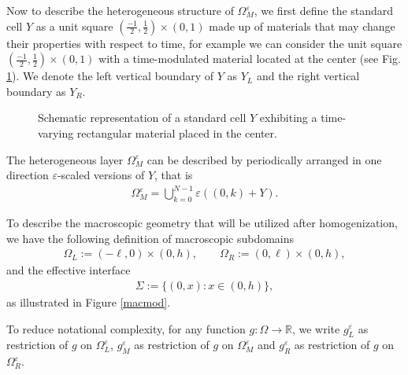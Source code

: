 \documentclass[11pt]{article}
\def\es{\varepsilon}
\def\orr{\Omega_R^\varepsilon}
\def\omm{\Omega_M^\varepsilon}
\def\oll{\Omega_L^\varepsilon}
\begin{document}
Now to describe the heterogeneous structure of $\omm$, we first define the standard cell $Y$ as a unit square $(\tfrac{-1}{2},\tfrac{1}{2})\times (0,1)$  made up of materials that may change their properties with respect to time, for example we can consider the unit square $(\tfrac{-1}{2},\tfrac{1}{2})\times (0,1)$ with a time-modulated material located at the center (see Fig. \ref{scell}). We denote the left vertical boundary of $Y$ as $Y_L$ and the right vertical boundary as $Y_R$.
\begin{figure}[ht]
	\begin{center}
		\caption{Schematic representation of a standard cell $Y$ exhibiting a time-varying rectangular material placed in the center.}
		\label{scell}
	\end{center}
\end{figure}

The heterogeneous layer $\omm$ can be described by periodically arranged in one direction $\varepsilon$-scaled versions of $Y$, that is
\begin{align*}
    \omm= \bigcup_{k=0}^{N-1} \es\left((0,k)+Y\right).
\end{align*}

To describe the macroscopic geometry that will be utilized after homogenization, we have the following definition of macroscopic subdomains
 \begin{align*}\Omega_L := \left(-\ell,0\right)\times (0,h),\qquad
    \Omega_R :=\left(0,\ell\right)\times (0,h),
    \end{align*}
and the effective interface
\begin{align*}
    \Sigma :=\{(0,x):x\in (0,h)\},
\end{align*}
as illustrated in Figure \ref{macmod}.


To reduce notational complexity, for any function $g:\Omega\rightarrow \mathbb{R}$,  we write $g_L^\es$ as restriction of $g$ on $\oll$, $g_M^\es$ as restriction of $g$ on $\omm$ and $g_R^\es$ as restriction of $g$ on $\orr$.
\end{document}
